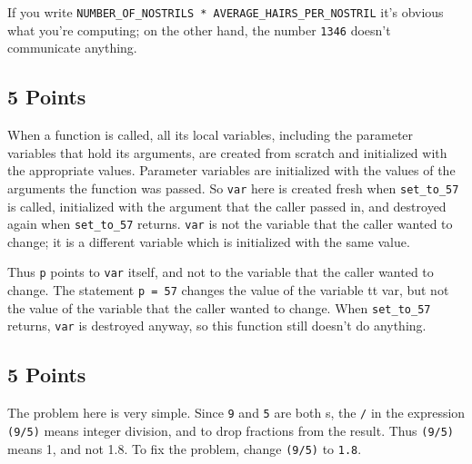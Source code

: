 If you write {\tt NUMBER\_OF\_NOSTRILS * AVERAGE\_HAIRS\_PER\_NOSTRIL} it's
obvious what you're computing; on the other hand, the number {\tt 1346}
doesn't communicate anything.

\subsection{5 Points}

When a function is called, all its local variables, including the
parameter variables that hold its arguments, are created from scratch
and initialized with the appropriate values.  Parameter variables are
initialized with the values of the arguments the function was passed.
So {\tt var} here is created fresh when {\tt set\_to\_57} is called, 
initialized with the argument that the caller passed in, and destroyed
again when {\tt set\_to\_57} returns.  {\tt var} is not the variable
that the caller wanted to change; it is a different variable which is
initialized with the same value. 

Thus {\tt p} points to {\tt var} itself, and not to the variable that
the caller wanted to change.  The statement {\tt *p = 57} changes the
value of the variable {tt var}, but not the value of the variable that
the caller wanted to change.  When {\tt set\_to\_57} returns, {\tt var}
is destroyed anyway, so this function still doesn't do anything.

\subsection{5 Points}

The problem here is very simple.  Since {\tt 9} and {\tt 5} are both
\int s, the {\tt /} in the expression {\tt (9/5)} means integer
division, and to drop fractions from the result.  Thus {\tt (9/5)} means
1, and not 1.8.  To fix the problem, change {\tt (9/5)} to {\tt 1.8}.  


